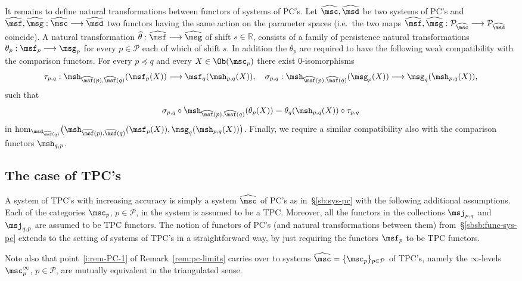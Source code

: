 It remains to define natural transformations between functors of
systems of PC's. Let $\widehat{\msc}, \widehat{\msd}$ be two systems of PC's and
$\widehat{\msf}, \widehat{\msg}: \widehat{\msc} \longrightarrow
\widehat{\msd}$ two functors having the same action on the parameter
spaces (i.e.~the two maps
$\widehat{\msf}, \widehat{\msg}: \mathcal{P}_{\widehat{\msc}}
\longrightarrow \mathcal{P}_{\widehat{\msd}}$ coincide). A natural
transformation
$\widehat{\theta}: \widehat{\msf} \longrightarrow \widehat{\msg}$ of
shift $s \in \mathbb{R}$, consists of a family of persistence natural
transformations $\theta_p : \msf_p \longrightarrow \msg_p$ for every
$p \in \mathcal{P}$ each of which of shift $s$. In addition the
$\theta_p$ are required to have the following weak compatibility with
the comparison functors. For every $p \preceq q$ and every
$X \in \Ob(\msc_p)$ there exist $0$-isomorphisms
$$\tau_{p,q}: \msh_{\widehat{\msf}(p), \widehat{\msf}(q)}(\msf_p (X))
\longrightarrow \msf_q (\msh_{p,q}(X)), \quad \sigma_{p,q}:
\msh_{\widehat{\msf}(p), \widehat{\msf}(q)}(\msg_p(X)) \longrightarrow
\msg_q(\msh_{p,q}(X)),$$ such that
$$\sigma_{p,q} \circ \msh_{\widehat{\msf}(p), \widehat{\msf}(q)}(\theta_p(X)) = 
\theta_q(\msh_{p,q}(X)) \circ \tau_{p,q}$$ in
$\hom_{\msd_{\widehat{\msf}(q)}} \bigl( \msh_{\widehat{\msf}(p),
  \widehat{\msf}(q)}(\msf_p (X)), \msg_q(\msh_{p,q}(X))
\bigr)$. Finally, we require a similar compatibility also with the
comparison functors $\msh_{q,p}$.

\subsection{The case of TPC's} \label{sb:sys-tpc} A system of TPC's
with increasing accuracy is simply a system $\widehat{\msc}$ of PC's
as in~\S\ref{sb:sys-pc} with the following additional
assumptions. Each of the categories $\msc_p$, $p \in \mathcal{P}$, in
the system is assumed to be a TPC. Moreover, all the functors in the
collections $\msj_{p,q}$ and $\msj_{q,p}$ are assumed to be TPC
functors. The notion of functors of PC's (and natural transformations
between them) from~\S\ref{sbsb:func-sys-pc} extends to the setting of
systems of TPC's in a straightforward way, by just requiring the
functors ${\msf}_p$ to be TPC functors.

Note also that point~\eqref{i:rem-PC-1} of Remark~\ref{rem:pc-limits}
carries over to systems
$\widehat{\msc} = \{\msc_p\}_{p \in \mathcal{P}}$ of TPC's, namely the
$\infty$-levels $\msc^{\infty}_p$, $p \in \mathcal{P}$, are mutually
equivalent in the triangulated sense.




